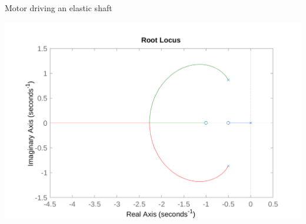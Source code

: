\documentclass[presentation,aspectratio=169, usenames, dvipsnames]{beamer}
\begin{document}
\begin{frame}[label={sec:org51c1623}]{Motor driving an elastic shaft}
\begin{center}
  \includegraphics[width=.7\linewidth]{../../figures/shaft-rlocus}
\end{center}
\end{frame}
\end{document}
